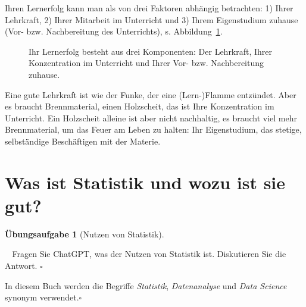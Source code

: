 \documentclass[
  a4paper,
  DIV=11]{scrreprt}
\theoremstyle{definition}
\newtheorem{exercise}{Übungsaufgabe}[chapter]
\theoremstyle{definition}
\theoremstyle{definition}
\theoremstyle{remark}
\begin{document}
Ihren Lernerfolg kann man als von drei Faktoren abhängig betrachten: 1)
Ihrer Lehrkraft, 2) Ihrer Mitarbeit im Unterricht und 3) Ihrem
Eigenstudium zuhause (Vor- bzw. Nachbereitung des Unterrichts), s.
Abbildung~\ref{fig-erfolgsrezept}.

\begin{figure}


\caption{\label{fig-erfolgsrezept}Ihr Lernerfolg besteht aus drei
Komponenten: Der Lehrkraft, Ihrer Konzentration im Unterricht und Ihrer
Vor- bzw. Nachbereitung zuhause.}

\end{figure}%

Eine gute Lehrkraft ist wie der Funke, der eine (Lern-)Flamme entzündet.
Aber es braucht Brennmaterial, einen Holzscheit, das ist Ihre
Konzentration im Unterricht. Ein Holzscheit alleine ist aber nicht
nachhaltig, es braucht viel mehr Brennmaterial, um das Feuer am Leben zu
halten: Ihr Eigenstudium, das stetige, selbständige Beschäftigen mit der
Materie.

\section{Was ist Statistik und wozu ist sie
gut?}\label{was-ist-statistik-und-wozu-ist-sie-gut}

\begin{exercise}[Nutzen von
Statistik]\protect\hypertarget{exr-nutzen-statistik}{}\label{exr-nutzen-statistik}

🏋️‍♀️ Fragen Sie ChatGPT, was der Nutzen von Statistik ist. Diskutieren Sie
die Antwort. \(\square\)

\end{exercise}

\begin{tcolorbox}[enhanced jigsaw, leftrule=.75mm, opacitybacktitle=0.6, colback=white, colframe=quarto-callout-note-color-frame, coltitle=black, colbacktitle=quarto-callout-note-color!10!white, opacityback=0, left=2mm, breakable, titlerule=0mm, toptitle=1mm, bottomtitle=1mm, rightrule=.15mm, title=\textcolor{quarto-callout-note-color}{\faInfo}\hspace{0.5em}{Hinweis}, arc=.35mm, bottomrule=.15mm, toprule=.15mm]

In diesem Buch werden die Begriffe \emph{Statistik}, \emph{Datenanalyse}
und \emph{Data Science} synonym verwendet.\(\square\)

\end{tcolorbox}
\end{document}

